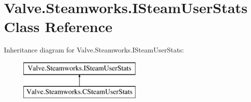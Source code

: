 \hypertarget{classValve_1_1Steamworks_1_1ISteamUserStats}{}\section{Valve.\+Steamworks.\+I\+Steam\+User\+Stats Class Reference}
\label{classValve_1_1Steamworks_1_1ISteamUserStats}
Inheritance diagram for Valve.\+Steamworks.\+I\+Steam\+User\+Stats\+:\begin{figure}[H]
\begin{center}
\leavevmode
\includegraphics[height=2.000000cm]{classValve_1_1Steamworks_1_1ISteamUserStats}
\end{center}
\end{figure}
